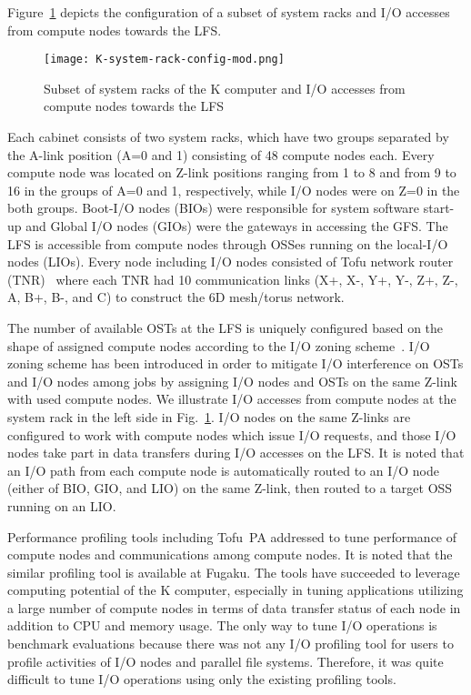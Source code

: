 \documentclass{jhps}
\begin{document}
Figure~\ref{fig:SUBSET_SYSRACK_K} depicts the configuration of a subset of system racks
and I/O accesses from compute nodes towards the LFS.
%
\begin{figure}[tb]
\centering
\texttt{[image: K-system-rack-config-mod.png]}
\caption{Subset of system racks of the K computer and I/O accesses from compute nodes
towards the LFS}
\label{fig:SUBSET_SYSRACK_K}
\end{figure}
%
Each cabinet consists of two system racks, which have two groups separated
by the A-link position (A=0 and 1) consisting of 48 compute nodes each.
Every compute node was located on Z-link positions ranging from 1 to 8 and
from 9 to 16 in the groups of A=0 and 1, respectively, while I/O nodes were
on Z=0 in the both groups.
Boot-I/O nodes (BIOs) were responsible for system software start-up and
Global I/O nodes (GIOs) were the gateways in accessing the GFS.
The LFS is accessible from compute nodes through OSSes running on the local-I/O nodes (LIOs).
Every node including I/O nodes consisted of Tofu network router (TNR)~\cite{tofu:micro2012}
where each TNR had 10 communication links (X+, X-, Y+, Y-, Z+, Z-, A, B+, B-, and C)
to construct the 6D mesh/torus network.

The number of available OSTs at the LFS is uniquely configured based on the shape of
assigned compute nodes according to the I/O zoning scheme~\cite{sumimoto:LUG2011}.
I/O zoning scheme has been introduced in order to mitigate I/O interference on OSTs
and I/O nodes among jobs by assigning I/O nodes and OSTs on the same Z-link
with used compute nodes.
We illustrate I/O accesses from compute nodes
at the system rack in the left side in Fig.~\ref{fig:SUBSET_SYSRACK_K}.
I/O nodes on the same Z-links are configured to work with compute nodes which
issue I/O requests, and those I/O nodes
take part in data transfers during I/O accesses on the LFS.
It is noted that an I/O path from each compute node is automatically routed to
an I/O node (either of BIO, GIO, and LIO) on the same Z-link,
then routed to a target OSS running on an LIO.

Performance profiling tools including Tofu~PA addressed to tune performance of
compute nodes and communications among compute nodes.
It is noted that the similar profiling tool is available at Fugaku.
The tools have succeeded to leverage computing potential of the K computer,
especially in tuning applications utilizing a large number of compute nodes
in terms of data transfer status of each node in addition to CPU and memory usage.
The only way to tune I/O operations is benchmark evaluations
because there was not any I/O profiling tool for users to profile activities
of I/O nodes and parallel file systems.
Therefore, it was quite difficult to tune I/O operations using
only the existing profiling tools.
\end{document}
